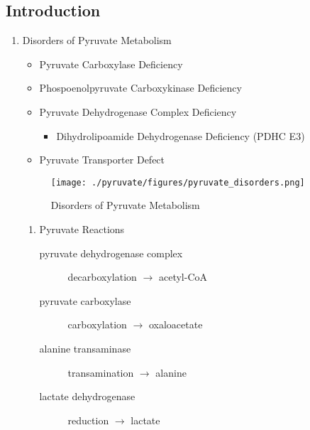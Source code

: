 \documentclass{scrartcl}
\begin{document}
\subsection{Introduction}
\label{sec:orga1af2ef}
\begin{enumerate}
\item Disorders of Pyruvate Metabolism
\label{sec:org122cda0}

\begin{itemize}
\item Pyruvate Carboxylase Deficiency
\item Phospoenolpyruvate Carboxykinase Deficiency
\item Pyruvate Dehydrogenase Complex Deficiency
\begin{itemize}
\item Dihydrolipoamide Dehydrogenase Deficiency (PDHC E3)
\end{itemize}
\item Pyruvate Transporter Defect
\end{itemize}


\begin{figure}[htbp]
\centering
\texttt{[image: ./pyruvate/figures/pyruvate\_disorders.png]}
\caption[TCA]{\label{fig:orgf31a7f7}
Disorders of Pyruvate Metabolism}
\end{figure}

\begin{enumerate}
\item Pyruvate Reactions
\label{sec:org7045713}

\begin{description}
\item[{pyruvate dehydrogenase complex}] decarboxylation \(\to\) acetyl-CoA
\end{description}


\begin{description}
\item[{pyruvate carboxylase}] carboxylation \(\to\) oxaloacetate
\end{description}


\begin{description}
\item[{alanine transaminase}] transamination \(\to\) alanine
\end{description}


\begin{description}
\item[{lactate dehydrogenase}] reduction \(\to\) lactate
\end{description}

\end{enumerate}
\end{enumerate}
\end{document}
